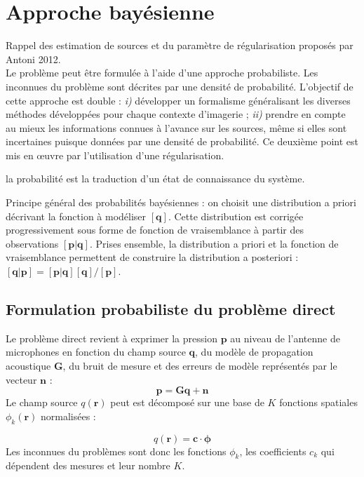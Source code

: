 \section{Approche bayésienne}

Rappel des estimation de sources et du paramètre de régularisation proposés par Antoni 2012.\\



Le problème peut être formulée à l'aide d'une approche probabiliste. Les inconnues du problème sont décrites  par une densité de probabilité. L'objectif de cette approche est double : \textit{i)} développer un formalisme généralisant les diverses méthodes développées pour chaque contexte d'imagerie ; \textit{ii)} prendre en compte au mieux les informations connues à l'avance sur les sources, même si elles sont incertaines puisque données par une densité de probabilité. Ce deuxième point est mis en œuvre par l'utilisation d'une régularisation.



la probabilité est la traduction d'un état de connaissance du système.


Principe général des probabilités bayésiennes : on choisit une distribution a priori décrivant la fonction à modéliser $[\bm{q}]$. Cette distribution est corrigée progressivement sous forme de fonction de vraisemblance à partir des observations $[\bm{p|q}]$. Prises ensemble, la distribution a priori et la fonction de vraisemblance permettent de construire la distribution a posteriori : $[\bm{q|p}] = [\bm{p|q}][\bm{q}]/[\bm{p}]$.

\subsection{Formulation probabiliste du problème direct}

Le problème direct revient à exprimer la pression $\bm{p}$ au niveau de l'antenne de microphones en fonction du champ source $\bm{q}$, du modèle de propagation acoustique $\bm{G}$, du bruit de mesure et des erreurs de modèle représentés par le vecteur $\bm{n}$ : 
\begin{equation}
\bm{p}=\bm{Gq}+\bm{n}
\end{equation}
Le champ source $q(\bm{r})$ peut est décomposé sur une base de $K$ fonctions spatiales $\phi_k(\bm{r})$ normalisées :

\begin{equation}
q(\bm{r}) = \bm{c} \cdot \bm{\phi}
\end{equation}
Les inconnues du problèmes sont donc les fonctions $\phi_k$, les coefficients $c_k$ qui dépendent des mesures et leur nombre $K$.\\

